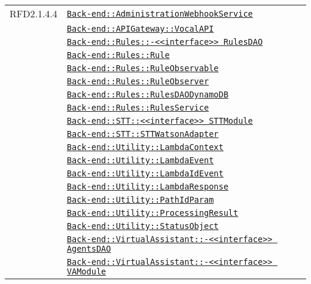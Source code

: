 \begin{longtable}{|>{\centering}m{3cm}|m{10cm}<{\centering}|}
RFD2.1.4.4 & \hyperref[Back-end::AdministrationWebhookService]{\texttt{Back-end::AdministrationWebhookService}}\\
& \hyperref[Back-end::APIGateway::VocalAPI]{\texttt{Back-end::APIGateway::VocalAPI}}\\
& \hyperref[Back-end::Rules::<<interface>> RulesDAO]{\texttt{Back-end::Rules::-\linebreak <<interface>> RulesDAO}}\\
& \hyperref[Back-end::Rules::Rule]{\texttt{Back-end::Rules::Rule}}\\
& \hyperref[Back-end::Rules::RuleObservable]{\texttt{Back-end::Rules::RuleObservable}}\\
& \hyperref[Back-end::Rules::RuleObserver]{\texttt{Back-end::Rules::RuleObserver}}\\
& \hyperref[Back-end::Rules::RulesDAODynamoDB]{\texttt{Back-end::Rules::RulesDAODynamoDB}}\\
& \hyperref[Back-end::Rules::RulesService]{\texttt{Back-end::Rules::RulesService}}\\
& \hyperref[Back-end::STT::<<interface>> STTModule]{\texttt{Back-end::STT::<<interface>> STTModule}}\\
& \hyperref[Back-end::STT::STTWatsonAdapter]{\texttt{Back-end::STT::STTWatsonAdapter}}\\
& \hyperref[Back-end::Utility::LambdaContext]{\texttt{Back-end::Utility::LambdaContext}}\\
& \hyperref[Back-end::Utility::LambdaEvent]{\texttt{Back-end::Utility::LambdaEvent}}\\
& \hyperref[Back-end::Utility::LambdaIdEvent]{\texttt{Back-end::Utility::LambdaIdEvent}}\\
& \hyperref[Back-end::Utility::LambdaResponse]{\texttt{Back-end::Utility::LambdaResponse}}\\
& \hyperref[Back-end::Utility::PathIdParam]{\texttt{Back-end::Utility::PathIdParam}}\\
& \hyperref[Back-end::Utility::ProcessingResult]{\texttt{Back-end::Utility::ProcessingResult}}\\
& \hyperref[Back-end::Utility::StatusObject]{\texttt{Back-end::Utility::StatusObject}}\\
& \hyperref[Back-end::VirtualAssistant::<<interface>> AgentsDAO]{\texttt{Back-end::VirtualAssistant::-\linebreak <<interface>> AgentsDAO}}\\
& \hyperref[Back-end::VirtualAssistant::<<interface>> VAModule]{\texttt{Back-end::VirtualAssistant::-\linebreak <<interface>> VAModule}}\\

\end{longtable}

